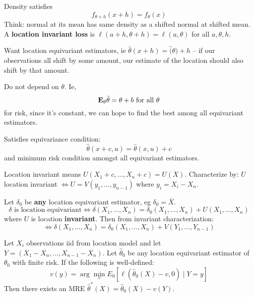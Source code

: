 \documentclass{article}
\begin{document}
\begin{definition}
Density satisfies
$$f_{\theta + h} (x+h) = f_\theta(x)$$
Think: normal at its mean has same density as a shifted normal at shifted mean.\\ 
A \textbf{location invariant loss} is $\ell(a + h,\theta + h ) = \ell(a,\theta)$ for all $a, \theta, h$. 
\end{definition}
Want location equivariant estimators, ie $\hat \theta(x + h) = \hat(\theta) + h$ -- if our observations all shift by some amount, our estimate of the location should also shift by that amount. 

\begin{fact}
Do not depend on $\theta$. Ie, 
$$\mathbf{E}_\theta \hat \theta = \theta + b \text{ for all } \theta $$
for risk, since it's constant, we can hope to find the best among all equivariant estimators.
\end{fact}

\begin{definition}[MRE]
Satisfies equivariance condition: $$\hat \theta(x+c, u) = \hat \theta (x,u) + c$$
and minimum risk condition amongst all equivariant estimators. 
\end{definition}
\begin{definition}
Location invariant means $U(X_1 + c,\ldots,X_n + c) = U(X)$. Characterize by:
$U$ location invariant $\iff U = V(y_1, \ldots, y_{n-1})$ where $y_i = X_i - X_n$. 
\end{definition}
\begin{fact}
Let $\delta_0$ be \textbf{any} location equivariant estimator, eg $\delta_0 = \bar X$. 
$$\delta \text { is location equivariant} \iff \delta(X_1,\ldots,X_n) = \delta_0(X_1,\ldots,X_n) + U(X_1,\ldots, X_n) $$ 
where $U$ is location \textbf{invariant}. Then from invariant characterization:
$$\iff \delta(X_1,\ldots,X_n) = \delta_0(X_1,\ldots,X_n) + V(Y_1,\ldots, Y_{n-1})$$
\end{fact}

\begin{recipe}
Let $X_i$ observations iid from location model and let $Y = (X_1 - X_n, \ldots, X_{n-1} - X_n)$. Let $\hat \theta_0$ be any location equivariant estimator of $\theta_0$ with finite risk. If the following is well-defined:
$$v(y) = \arg \min _v E_0 [\ell(\hat \theta_0 (X) - v, 0) \mid Y = y]$$
Then there exists an MRE $\hat \theta^*(X) = \hat \theta_0(X) - v(Y)$.	
\end{recipe}
\end{document}
